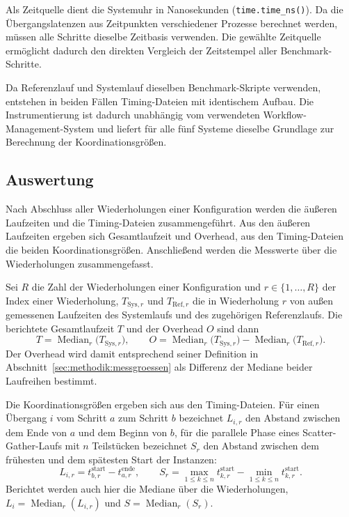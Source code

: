 Als Zeitquelle dient die Systemuhr in Nanosekunden
(\texttt{time.time\_ns()}). Da die Übergangslatenzen aus
Zeitpunkten verschiedener Prozesse berechnet werden, müssen alle
Schritte dieselbe Zeitbasis verwenden. Die gewählte Zeitquelle
ermöglicht dadurch den direkten Vergleich der Zeitstempel aller
Benchmark-Schritte.

Da Referenzlauf und Systemlauf dieselben Benchmark-Skripte
verwenden, entstehen in beiden Fällen Timing-Dateien mit
identischem Aufbau. Die Instrumentierung ist dadurch unabhängig
vom verwendeten Workflow-Management-System und liefert für alle
fünf Systeme dieselbe Grundlage zur Berechnung der
Koordinationsgrößen.

\subsection{Auswertung}
\label{sec:methodik:auswertung}

Nach Abschluss aller Wiederholungen einer Konfiguration werden die
äußeren Laufzeiten und die Timing-Dateien zusammengeführt. Aus den
äußeren Laufzeiten ergeben sich Gesamtlaufzeit und Overhead, aus
den Timing-Dateien die beiden Koordinationsgrößen. Anschließend
werden die Messwerte über die Wiederholungen zusammengefasst.

Sei $R$ die Zahl der Wiederholungen einer Konfiguration und
$r \in \{1,\ldots,R\}$ der Index einer Wiederholung,
$T_{\mathrm{Sys},r}$ und $T_{\mathrm{Ref},r}$ die in Wiederholung
$r$ von außen gemessenen Laufzeiten des Systemlaufs und des
zugehörigen Referenzlaufs. Die berichtete Gesamtlaufzeit $T$ und
der Overhead $O$ sind dann
\[
  T = \operatorname{Median}_{r}\bigl(T_{\mathrm{Sys},r}\bigr),
  \qquad
  O = \operatorname{Median}_{r}\bigl(T_{\mathrm{Sys},r}\bigr)
      - \operatorname{Median}_{r}\bigl(T_{\mathrm{Ref},r}\bigr).
\]
Der Overhead wird damit entsprechend seiner Definition in
Abschnitt~\ref{sec:methodik:messgroessen} als Differenz der
Mediane beider Laufreihen bestimmt.

Die Koordinationsgrößen ergeben sich aus den Timing-Dateien. Für
einen Übergang $i$ vom Schritt $a$ zum Schritt $b$ bezeichnet
$L_{i,r}$ den Abstand zwischen dem Ende von $a$ und dem Beginn von
$b$, für die parallele Phase eines Scatter-Gather-Laufs mit $n$
Teilstücken bezeichnet $S_r$ den Abstand zwischen dem frühesten und
dem spätesten Start der Instanzen:
\[
  L_{i,r} = t^{\text{start}}_{b,r} - t^{\text{ende}}_{a,r},
  \qquad
  S_r = \max_{1 \le k \le n} t^{\text{start}}_{k,r}
      - \min_{1 \le k \le n} t^{\text{start}}_{k,r}.
\]
Berichtet werden auch hier die Mediane über die Wiederholungen,
$L_i = \operatorname{Median}_{r}(L_{i,r})$ und
$S = \operatorname{Median}_{r}(S_r)$.

